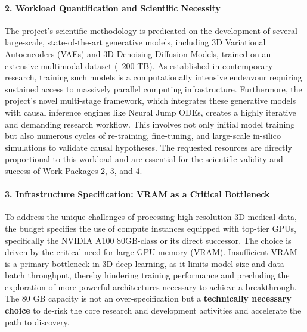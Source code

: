 \paragraph{2. Workload Quantification and Scientific Necessity}
The project's scientific methodology is predicated on the development of several large-scale, state-of-the-art generative models, including 3D Variational Autoencoders (VAEs) and 3D Denoising Diffusion Models, trained on an extensive multimodal dataset (~200 TB). As established in contemporary research, training such models is a computationally intensive endeavour requiring sustained access to massively parallel computing infrastructure. Furthermore, the project's novel multi-stage framework, which integrates these generative models with causal inference engines like Neural Jump ODEs, creates a highly iterative and demanding research workflow. This involves not only initial model training but also numerous cycles of re-training, fine-tuning, and large-scale in-silico simulations to validate causal hypotheses. The requested resources are directly proportional to this workload and are essential for the scientific validity and success of Work Packages 2, 3, and 4.

\paragraph{3. Infrastructure Specification: VRAM as a Critical Bottleneck}
To address the unique challenges of processing high-resolution 3D medical data, the budget specifies the use of compute instances equipped with top-tier GPUs, specifically the NVIDIA A100 80GB-class or its direct successor. The choice is driven by the critical need for large GPU memory (VRAM). Insufficient VRAM is a primary bottleneck in 3D deep learning, as it limits model size and data batch throughput, thereby hindering training performance and precluding the exploration of more powerful architectures necessary to achieve a breakthrough. The 80 GB capacity is not an over-specification but a \textbf{technically necessary choice} to de-risk the core research and development activities and accelerate the path to discovery.

